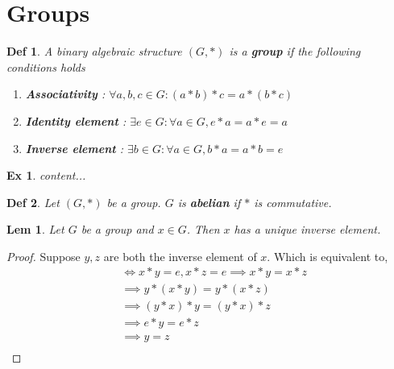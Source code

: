 \documentclass[paper=a4, fontsize=11pt]{scrartcl}
\newcommand{\subscript}[2]{$#1 _ #2$}
\newtheorem{definition}{Def}
\newtheorem{example}{Ex}
\newtheorem{lemma}{Lem}
\begin{document}
\vspace{0.25in}
\section{Groups}
\vspace{0.25in}

\begin{definition}
	A binary algebraic structure $(G,\ast)$ is a \textbf{group} if the following conditions holds
	\begin{enumerate}[label=(\subscript{G}{{\arabic*}})]
		\item \textbf{Associativity} : $\forall a,b,c \in G : (a \ast b) \ast c = a \ast (b \ast c)$
		\item \textbf{Identity element} : $\exists e \in G : \forall a \in G , e \ast a = a \ast e = a$
		\item \textbf{Inverse element} : $\exists b \in G : \forall a \in G , b \ast a = a \ast b = e$\\
	\end{enumerate}
\end{definition}

\begin{example}
	content...\\
\end{example}

\begin{definition}
	Let $(G,\ast)$ be a group. $G$ is \textbf{abelian} if $\ast$ is commutative.\\
\end{definition}

\begin{lemma}
	Let $G$ be a group and $x \in G$. Then $x$ has a unique inverse element.\\
\end{lemma}

\begin{proof}
	Suppose $y,z$ are both the inverse element of $x$. Which is equivalent to,\\
	\begin{equation}\nonumber
		\begin{split}
		 &\iff x \ast y =e , x\ast z =e \implies x\ast y = x \ast z \\
		 &\implies y \ast(x\ast y) = y \ast(x \ast z) \\ 
		 &\implies  (y \ast x)\ast y = (y \ast x) \ast z \\
		 &\implies e \ast y = e \ast z \\
		 &\implies y = z \\
		\end{split}
	\end{equation}
\end{proof}
\end{document}
